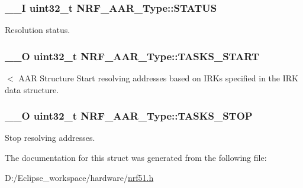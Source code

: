 \subsubsection[{S\+T\+A\+T\+U\+S}]{\setlength{\rightskip}{0pt plus 5cm}\+\_\+\+\_\+\+I uint32\+\_\+t N\+R\+F\+\_\+\+A\+A\+R\+\_\+\+Type\+::\+S\+T\+A\+T\+U\+S}\label{struct_n_r_f___a_a_r___type_a6370050a6b5e86260a134aa68badaa78}
Resolution status. \hypertarget{struct_n_r_f___a_a_r___type_a0433e01e4de6898a1dc47228b4d432e6}{}
\subsubsection[{T\+A\+S\+K\+S\+\_\+\+S\+T\+A\+R\+T}]{\setlength{\rightskip}{0pt plus 5cm}\+\_\+\+\_\+\+O uint32\+\_\+t N\+R\+F\+\_\+\+A\+A\+R\+\_\+\+Type\+::\+T\+A\+S\+K\+S\+\_\+\+S\+T\+A\+R\+T}\label{struct_n_r_f___a_a_r___type_a0433e01e4de6898a1dc47228b4d432e6}
$<$ A\+A\+R Structure Start resolving addresses based on I\+R\+Ks specified in the I\+R\+K data structure. \hypertarget{struct_n_r_f___a_a_r___type_aa11597a0f75ec90e6e4a672363c9672e}{}
\subsubsection[{T\+A\+S\+K\+S\+\_\+\+S\+T\+O\+P}]{\setlength{\rightskip}{0pt plus 5cm}\+\_\+\+\_\+\+O uint32\+\_\+t N\+R\+F\+\_\+\+A\+A\+R\+\_\+\+Type\+::\+T\+A\+S\+K\+S\+\_\+\+S\+T\+O\+P}\label{struct_n_r_f___a_a_r___type_aa11597a0f75ec90e6e4a672363c9672e}
Stop resolving addresses. 

The documentation for this struct was generated from the following file\+:\begin{DoxyCompactItemize}
\item 
D\+:/\+Eclipse\+\_\+workspace/hardware/\hyperlink{nrf51_8h}{nrf51.\+h}\end{DoxyCompactItemize}
